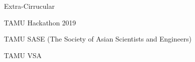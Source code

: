 \documentclass{resume} %
\begin{document}

\begin{rSection}{Extra-Cirrucular} \itemsep -3pt
    \item TAMU Hackathon 2019
    \item TAMU SASE (The Society of Asian Scientists and Engineers)
    \item TAMU VSA


\end{rSection}

\end{document}
